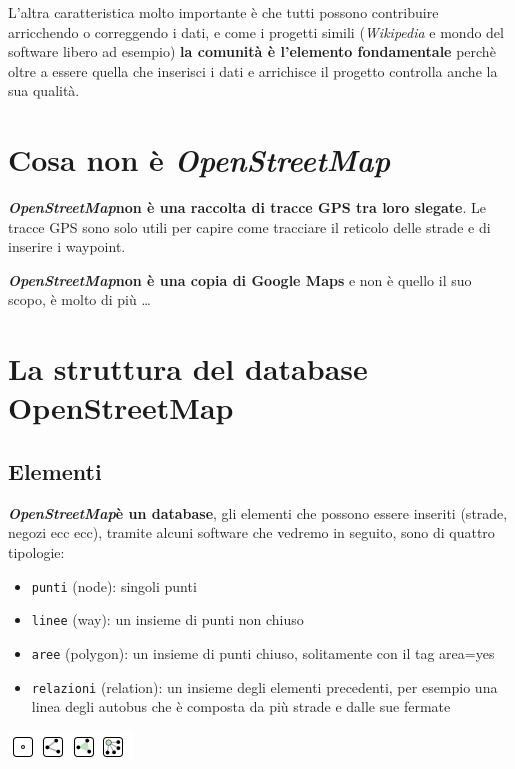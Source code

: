 \documentclass[a4paper,twoside,12pt,]{article}
\newcommand{\osm}{\emph{OpenStreetMap\xspace}}
\newcommand{\gps}{GPS\xspace}
\begin{document}
L'altra caratteristica molto importante è che tutti possono contribuire arricchendo o correggendo i dati, e come i progetti simili (\emph{Wikipedia} e mondo del software libero ad esempio) \textbf{la comunità è l'elemento fondamentale} perchè oltre a essere quella che inserisci i dati e arrichisce il progetto controlla anche la sua qualità.
\section{Cosa non è \osm}
\textbf{\osm non è una raccolta di tracce \gps tra loro slegate}. Le tracce \gps sono solo utili per capire come tracciare il reticolo delle strade e di inserire i waypoint.

\textbf{\osm non è una copia di Google Maps} e non è quello il suo scopo, è molto di più \dots

\section{La struttura del database OpenStreetMap}
\subsection{Elementi}
\textbf{\osm è un database}, gli elementi che possono essere inseriti (strade, negozi ecc ecc), tramite alcuni software che vedremo in seguito, sono di quattro tipologie:
\begin{itemize}
 \item \texttt{punti} (node): singoli punti
 \item \texttt{linee} (way): un insieme di punti non chiuso
 \item \texttt{aree} (polygon): un insieme di punti chiuso, solitamente con il tag area=yes
 \item \texttt{relazioni} (relation): un insieme degli elementi precedenti, per esempio una linea degli autobus che è composta da più strade e dalle sue fermate
\end{itemize}
\begin{center}
\includegraphics{elements.png}
\end{center}
\end{document}
